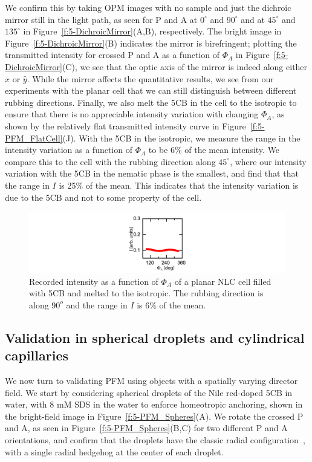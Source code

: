 We confirm this by taking OPM images with no sample and just the dichroic mirror still in the light path, as seen for P and A at $0^{\circ}$ and $90^{\circ}$ and at $45^{\circ}$ and $135^{\circ}$ in Figure~\ref{f:5-DichroicMirror}(A,B), respectively.
The bright image in Figure~\ref{f:5-DichroicMirror}(B) indicates the mirror is birefringent; plotting the transmitted intensity for crossed P and A as a function of $\Phi_A$ in Figure~\ref{f:5-DichroicMirror}(C), we see that the optic axis of the mirror is indeed along either $\hat{x}$ or $\hat{y}$.
While the mirror affects the quantitative results, we see from our experiments with the planar cell that we can still distinguish between different rubbing directions.
Finally, we also melt the 5CB in the cell to the isotropic to ensure that there is no appreciable intensity variation with changing $\Phi_A$, as shown by the relatively flat transmitted intensity curve in Figure~\ref{f:5-PFM_FlatCell}(J).
With the 5CB in the isotropic, we measure the range in the intensity variation as a function of $\Phi_A$ to be 6\% of the mean intensity.
We compare this to the cell with the rubbing direction along $45^{\circ}$, where our intensity variation with the 5CB in the nematic phase is the smallest, and find that that the range in $I$ is 25\% of the mean.
This indicates that the intensity variation is due to the 5CB and not to some property of the cell.
\begin{figure}
  \includegraphics{figures/C5/Ch5-Figs_IsotropicPlanar.png}
  \caption{Recorded intensity as a function of $\Phi_A$ of a planar NLC cell filled with 5CB and melted to the isotropic.
  The rubbing direction is along $90^o$ and the range in $I$ is 6\% of the mean.}\label{f:5-IsotropicPlanar}
\end{figure}


\subsection{Validation in spherical droplets and cylindrical capillaries}
We now turn to validating PFM using objects with a spatially varying director field.
We start by considering spherical droplets of the Nile red-doped 5CB in water, with 8 mM SDS in the water to enforce homeotropic anchoring, shown in the bright-field image in Figure~\ref{f:5-PFM_Spheres}(A).
We rotate the crossed P and A, as seen in Figure~\ref{f:5-PFM_Spheres}(B,C) for two different P and A orientations, and confirm that the droplets have the classic radial configuration~\cite{RN177}, with a single radial hedgehog at the center of each droplet.

